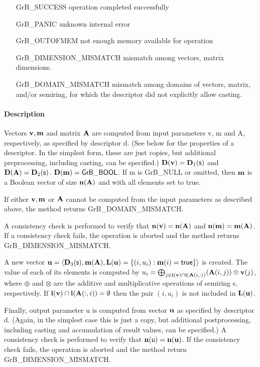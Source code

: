 \begin{itemize}[leftmargin=2.1in]
\item[{\sf GrB\_SUCCESS}]             operation completed successfully
\item[{\sf GrB\_PANIC}]               unknown internal error
\item[{\sf GrB\_OUTOFMEM}]            not enough memory available for operation
\item[{\sf GrB\_DIMENSION\_MISMATCH}] mismatch among vectors, matrix dimensions.
\item[{\sf GrB\_DOMAIN\_MISMATCH}]    mismatch among domains of vectors, matrix, and/or semiring, for which the descriptor did not explicitly allow casting.
\end{itemize}


\paragraph{Description}

Vectors ${\bf v}, {\bf m}$ and matrix ${\bf A}$ are computed from
input parameters {\sf v}, {\sf m} and {\sf A}, respectively, as specified
by descriptor {\sf d}. (See below for the properties of a descriptor. In
the simplest form, these are just copies, but additional preprocessing,
including casting, can be specified.)  $\bold{D}({\bf v}) =
\bold{D}_1({\sf s})$ and $\bold{D}({\bf A}) = \bold{D}_2({\sf s})$.
$\bold{D}({\bf m}) = {\sf GrB\_BOOL}$.  If {\sf m} is {\sf GrB\_NULL} or omitted,
then ${\bf m}$ is a Boolean vector of size $\bold{n}({\bf A})$
and with all elements set to {\sf true}.

If either ${\bf v}, {\bf m}$ or ${\bf A}$ cannot be computed
from the input parameters as described above, the method returns {\sf
GrB\_DOMAIN\_MISMATCH}.

A consistency check is performed to verify that $\bold{n}({\bf v})
= \bold{n}({\bf A})$ and $\bold{n}({\bf m}) =
\bold{m}({\bf A})$. If a consistency check fails, the operation is
aborted and the method returns {\sf GrB\_DIMENSION\_MISMATCH}.

A new vector ${\bf u} = \langle \bold{D}_3({\sf s}),
\bold{m}({\bf A}), \bold{L}({\bf u}) = \{(i,u_i) : {\bf m}(i)
= {\sf true} \} \rangle$ is created.  The value of each of its elements
is computed by $u_i = \bigoplus_{j \in {\bf i}({\bf v}) \cap
{\bf i}({\bf A}(i,:))} ({\bf A}(i,j)) \otimes {\bf v}(j)$,
where $\oplus$ and $\otimes$ are the additive and multiplicative
operations of semiring {\sf s}, respectively.  If ${\bf i}({\bf v})
\cap {\bf i}({\bf A}(:,i)) = \emptyset$ then the pair $(i,u_i)$
is not included in $\bold{L}({\bf u})$.

Finally, output parameter {\sf u} is computed from vector ${\bf u}$
as specified by descriptor {\sf d}. (Again, in the simplest case this
is just a copy, but additional postprocessing, including casting and
accumulation of result values, can be specified.)  A consistency check is
performed to verify that $\bold{n}({\sf u}) = \bold{n}({\bf u})$. If
the consistency check fails, the operation is aborted and the method
return {\sf GrB\_DIMENSION\_MISMATCH}.
